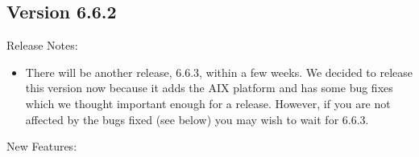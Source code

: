 \subsection{\label{sec:New-6-6-2}Version 6.6.2}

\noindent Release Notes:

\begin{itemize}

\item There will be another release, 6.6.3, within a few weeks.  We decided to
	release this version now because it adds the AIX platform and has some bug
	fixes which we thought important enough for a release.  However, if you are
	not affected by the bugs fixed (see below) you may wish to wait for 6.6.3.
     

\end{itemize}


\noindent New Features:

